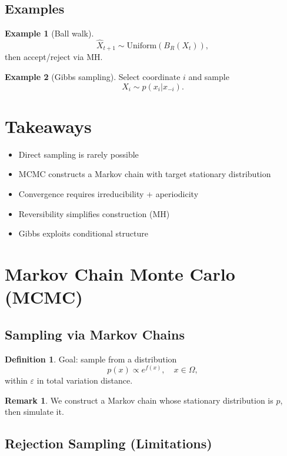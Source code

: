 \documentclass[12pt,oneside]{book}
\numberwithin{equation}{section}
\theoremstyle{definition}
\newtheorem{definition}{Definition}[section]
\newtheorem{example}{Example}[section]
\newtheorem{remark}{Remark}[section]
\theoremstyle{plain}
\theoremstyle{remark}
\begin{document}
\subsection*{Examples}

\begin{example}[Ball walk]
\[
\widehat{X}_{t+1} \sim \mathrm{Uniform}(B_R(X_t)),
\]
then accept/reject via MH.
\end{example}

\begin{example}[Gibbs sampling]
Select coordinate $i$ and sample
\[
X_i \sim p(x_i | x_{-i}).
\]
\end{example}


\section*{Takeaways}

\begin{itemize}
\item Direct sampling is rarely possible
\item MCMC constructs a Markov chain with target stationary distribution
\item Convergence requires irreducibility + aperiodicity
\item Reversibility simplifies construction (MH)
\item Gibbs exploits conditional structure
\end{itemize}

\section{Markov Chain Monte Carlo (MCMC)}

\subsection{Sampling via Markov Chains}

\begin{definition}
Goal: sample from a distribution
\[
p(x) \propto e^{f(x)}, \quad x \in \Omega,
\]
within $\varepsilon$ in total variation distance.
\end{definition}

\begin{remark}
We construct a Markov chain whose stationary distribution is $p$, then simulate it.
\end{remark}


\subsection*{Rejection Sampling (Limitations)}
\end{document}
